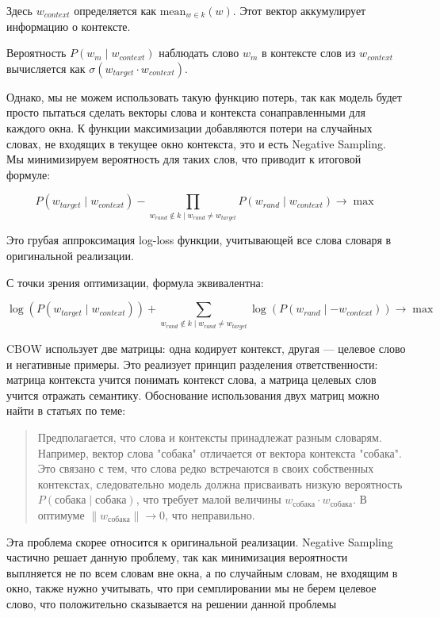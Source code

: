 \documentclass{article}
\begin{document}
    Здесь \( w_{context} \) определяется как \( \text{mean}_{w \in k}(w) \). Этот вектор аккумулирует информацию о контексте.  
    
    Вероятность \( P(w_m \mid w_{context}) \) наблюдать слово \( w_m \) в контексте слов из \( w_{context} \) вычисляется как \( \sigma(w_{target} \cdot w_{context}) \).  
    
    Однако, мы не можем использовать такую функцию потерь, так как модель будет просто пытаться сделать векторы слова и контекста сонаправленными для каждого окна. 
    К функции максимизации добавляются потери на случайных словах, не входящих в текущее окно контекста, это и есть Negative Sampling. Мы минимизируем вероятность для таких слов, что приводит к итоговой формуле:  
    
    \[
    P(w_{target} \mid w_{context}) - \prod_{w_{rand} \notin k \mid w_{rand} \neq w_{target}} P(w_{rand} \mid w_{context}) \rightarrow \max
    \]  
    
    Это грубая аппроксимация log-loss функции, учитывающей все слова словаря в оригинальной реализации.  
    
    С точки зрения оптимизации, формула эквивалентна:  
    
    \[
    \log(P(w_{target} \mid w_{context})) + \sum_{w_{rand} \notin k \mid w_{rand} \neq w_{target}} \log(P(w_{rand} \mid -w_{context})) \rightarrow \max
    \]  
    
    CBOW использует две матрицы: одна кодирует контекст, другая — целевое слово и негативные примеры. Это реализует принцип разделения ответственности:  
    матрица контекста учится понимать контекст слова, а матрица целевых слов учится отражать семантику.  
    Обоснование использования двух матриц можно найти в статьях по теме:  
    
    \begin{quote}  
    Предполагается, что слова и контексты принадлежат разным словарям. 
    Например, вектор слова "собака" отличается от вектора контекста "собака". 
    Это связано с тем, что слова редко встречаются в своих собственных контекстах, 
    следовательно модель должна присваивать 
    низкую вероятность \( P(\text{собака} \mid \text{собака}) \), что требует 
    малой величины \( w_{собака} \cdot w_{собака} \). В оптимуме \( \|w_{собака}\| \rightarrow 0 \), что неправильно.  
    \end{quote}  

    Эта проблема скорее относится к оригинальной реализации. Negative Sampling частично решает данную проблему, так как минимизация вероятности выплняется не по всем словам вне окна, а по случайным словам, не 
    входящим в окно, также нужно учитывать, что при семплировании мы не берем целевое слово, что положительно сказывается на решении данной проблемы
    
\end{document}
